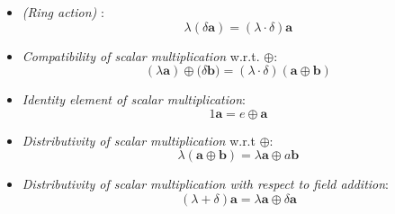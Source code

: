 \documentclass[a4paper,12pt]{scrartcl}    %
\newcommand{\OpB}{\oplus}
\begin{document}
\begin{landscape}
\begin{minipage}[c][\textheight]{0.60 \linewidth}
\begin{definition}
			\begin{itemize}
			\item \emph{(Ring action)} :
				\begin{equation}\label{scalarmulti}
					\lambda( \delta  \mathbf{a}) = (\lambda\cdot \delta)  \mathbf{a}
				\end{equation}
			\item \emph{Compatibility of scalar multiplication} w.r.t. $\OpB$:
				\begin{equation}\label{scalarcompat}
					 (\lambda \mathbf{a} ) \OpB (\delta \mathbf{b)}= (\lambda\cdot \delta) (\mathbf{a}\OpB \mathbf{b})
				\end{equation}
			\item \emph{Identity element of scalar multiplication}:
				\begin{equation}\label{scalaridentity}
					1 \mathbf{a} = e \OpB \mathbf{a}  
				\end{equation}
			\item \emph{Distributivity of scalar multiplication} w.r.t $\OpB$:
				\begin{equation}\label{scalarDistributivityA}
					\lambda ( \mathbf{a} \OpB \mathbf{b} ) = \lambda \mathbf{a} \OpB a \mathbf{b} 
				\end{equation}
			\item \emph{Distributivity of scalar multiplication with respect to field addition}:
				\begin{equation}\label{scalarDistributivityB}
					(\lambda + \delta ) \mathbf{a} = \lambda  \mathbf{a}  \OpB  \delta \mathbf{a}
				\end{equation}
			\end{itemize}

	    			
	    		\end{definition}


\end{minipage}
\end{landscape}
\end{document}
